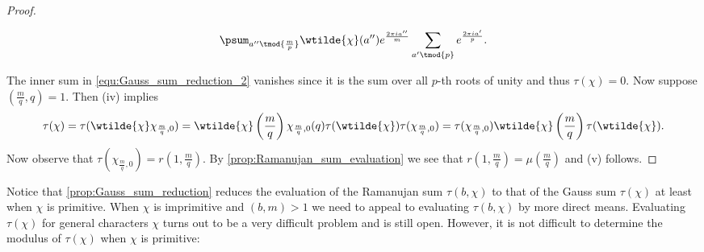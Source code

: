 \begin{proof}
\begin{enumerate}[label=(\roman*)]
          \begin{equation}\label{equ:Gauss_sum_reduction_2}
            \psum_{a'' \tmod{\frac{m}{p}}}\wtilde{\chi}(a'')e^{\frac{2\pi ia''}{m}}\sum_{a' \tmod{p}}e^{\frac{2\pi ia'}{p}}.
          \end{equation}
        \end{enumerate}
        The inner sum in \cref{equ:Gauss_sum_reduction_2} vanishes since it is the sum over all $p$-th roots of unity and thus $\tau(\chi) = 0$. Now suppose $\left(\frac{m}{q},q\right) = 1$. Then (iv) implies
        \[
          \tau(\chi) = \tau(\wtilde{\chi}\chi_{\frac{m}{q},0}) = \wtilde{\chi}\left(\frac{m}{q}\right)\chi_{\frac{m}{q},0}(q)\tau(\wtilde{\chi})\tau(\chi_{\frac{m}{q},0}) = \tau(\chi_{\frac{m}{q},0})\wtilde{\chi}\left(\frac{m}{q}\right)\tau(\wtilde{\chi}).
        \]
        Now observe that $\tau(\chi_{\frac{m}{q},0}) = r\left(1,\frac{m}{q}\right)$. By \cref{prop:Ramanujan_sum_evaluation} we see that $r\left(1,\frac{m}{q}\right) = \mu\left(\frac{m}{q}\right)$ and (v) follows.
      \end{proof}

      Notice that \cref{prop:Gauss_sum_reduction} reduces the evaluation of the Ramanujan sum $\tau(b,\chi)$ to that of the Gauss sum $\tau(\chi)$ at least when $\chi$ is primitive. When $\chi$ is imprimitive and $(b,m) > 1$ we need to appeal to evaluating $\tau(b,\chi)$ by more direct means. Evaluating $\tau(\chi)$ for general characters $\chi$ turns out to be a very difficult problem and is still open. However, it is not difficult to determine the modulus of $\tau(\chi)$ when $\chi$ is primitive:

